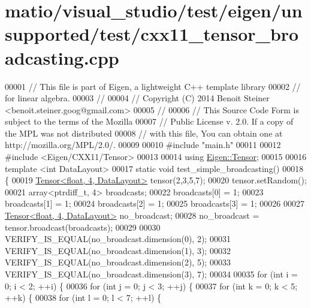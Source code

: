 \hypertarget{matio_2visual__studio_2test_2eigen_2unsupported_2test_2cxx11__tensor__broadcasting_8cpp_source}{}\section{matio/visual\+\_\+studio/test/eigen/unsupported/test/cxx11\+\_\+tensor\+\_\+broadcasting.cpp}
\label{matio_2visual__studio_2test_2eigen_2unsupported_2test_2cxx11__tensor__broadcasting_8cpp_source}

\begin{DoxyCode}
00001 \textcolor{comment}{// This file is part of Eigen, a lightweight C++ template library}
00002 \textcolor{comment}{// for linear algebra.}
00003 \textcolor{comment}{//}
00004 \textcolor{comment}{// Copyright (C) 2014 Benoit Steiner <benoit.steiner.goog@gmail.com>}
00005 \textcolor{comment}{//}
00006 \textcolor{comment}{// This Source Code Form is subject to the terms of the Mozilla}
00007 \textcolor{comment}{// Public License v. 2.0. If a copy of the MPL was not distributed}
00008 \textcolor{comment}{// with this file, You can obtain one at http://mozilla.org/MPL/2.0/.}
00009 
00010 \textcolor{preprocessor}{#include "main.h"}
00011 
00012 \textcolor{preprocessor}{#include <Eigen/CXX11/Tensor>}
00013 
00014 \textcolor{keyword}{using} \hyperlink{class_eigen_1_1_tensor}{Eigen::Tensor};
00015 
00016 \textcolor{keyword}{template} <\textcolor{keywordtype}{int} DataLayout>
00017 \textcolor{keyword}{static} \textcolor{keywordtype}{void} test\_simple\_broadcasting()
00018 \{
00019   \hyperlink{class_eigen_1_1_tensor}{Tensor<float, 4, DataLayout>} tensor(2,3,5,7);
00020   tensor.setRandom();
00021   array<ptrdiff\_t, 4> broadcasts;
00022   broadcasts[0] = 1;
00023   broadcasts[1] = 1;
00024   broadcasts[2] = 1;
00025   broadcasts[3] = 1;
00026 
00027   \hyperlink{class_eigen_1_1_tensor}{Tensor<float, 4, DataLayout>} no\_broadcast;
00028   no\_broadcast = tensor.broadcast(broadcasts);
00029 
00030   VERIFY\_IS\_EQUAL(no\_broadcast.dimension(0), 2);
00031   VERIFY\_IS\_EQUAL(no\_broadcast.dimension(1), 3);
00032   VERIFY\_IS\_EQUAL(no\_broadcast.dimension(2), 5);
00033   VERIFY\_IS\_EQUAL(no\_broadcast.dimension(3), 7);
00034 
00035   \textcolor{keywordflow}{for} (\textcolor{keywordtype}{int} i = 0; i < 2; ++i) \{
00036     \textcolor{keywordflow}{for} (\textcolor{keywordtype}{int} j = 0; j < 3; ++j) \{
00037       \textcolor{keywordflow}{for} (\textcolor{keywordtype}{int} k = 0; k < 5; ++k) \{
00038         \textcolor{keywordflow}{for} (\textcolor{keywordtype}{int} l = 0; l < 7; ++l) \{

\end{DoxyCode}
